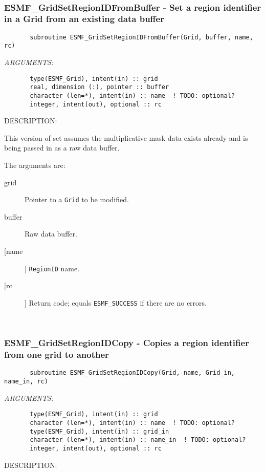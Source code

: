  
\mbox{}\hrulefill\ 
 
\subsubsection{ESMF\_GridSetRegionIDFromBuffer - Set a region identifier in a Grid from an existing data buffer}


 
\begin{verbatim}       subroutine ESMF_GridSetRegionIDFromBuffer(Grid, buffer, name, rc)\end{verbatim}{\em ARGUMENTS:}
\begin{verbatim}       type(ESMF_Grid), intent(in) :: grid
       real, dimension (:), pointer :: buffer
       character (len=*), intent(in) :: name  ! TODO: optional?
       integer, intent(out), optional :: rc\end{verbatim}
{\sf DESCRIPTION:\\ }


       This version of set assumes the multiplicative mask data exists already
       and is being passed in as a raw data buffer.
  
       The arguments are:
       \begin{description}
       \item[grid]
            Pointer to a {\tt Grid} to be modified.
       \item[buffer]
            Raw data buffer.
       \item [[name]]
             {\tt RegionID} name.
       \item[[rc]]
            Return code; equals {\tt ESMF\_SUCCESS} if there are no errors.
       \end{description}
   
 
\mbox{}\hrulefill\ 
 
\subsubsection{ESMF\_GridSetRegionIDCopy - Copies a region identifier from one grid to another}


 
\begin{verbatim}       subroutine ESMF_GridSetRegionIDCopy(Grid, name, Grid_in, name_in, rc)\end{verbatim}{\em ARGUMENTS:}
\begin{verbatim}       type(ESMF_Grid), intent(in) :: grid
       character (len=*), intent(in) :: name  ! TODO: optional?
       type(ESMF_Grid), intent(in) :: grid_in
       character (len=*), intent(in) :: name_in  ! TODO: optional?
       integer, intent(out), optional :: rc\end{verbatim}
{\sf DESCRIPTION:\\ }


